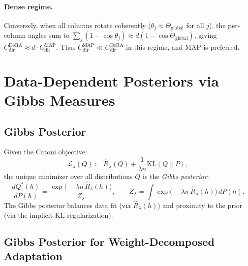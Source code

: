 \documentclass[11pt]{article}
\newcommand{\KL}{\mathrm{KL}}
\newcommand{\Rhatl}{\hat{R}_\lambda}
\begin{document}
\paragraph{Dense regime.}
Conversely, when all columns rotate coherently ($\theta_j \approx
\Theta_{\mathrm{global}}$ for all $j$), the per-column angles sum to
$\sum_j(1-\cos\theta_j) \approx d(1-\cos\Theta_{\mathrm{global}})$,
giving $C^{\mathrm{DoRA}}_{\mathrm{dir}} \approx d\cdot C^{\mathrm{MAP}}_{\mathrm{dir}}$.
Thus $C^{\mathrm{MAP}}_{\mathrm{dir}} \ll C^{\mathrm{DoRA}}_{\mathrm{dir}}$ in this regime,
and MAP is preferred.


\section{Data-Dependent Posteriors via Gibbs Measures}
\label{sec:gibbs}


\subsection{Gibbs Posterior}
\label{sec:gibbs_def}

Given the Catoni objective:
\[
  \mathcal{L}_\lambda(Q) \coloneqq \Rhatl(Q) + \frac{1}{\lambda n}\KL(Q \| P),
\]
the unique minimizer over all distributions $Q$ is the \emph{Gibbs posterior}:
\begin{equation}
  \frac{dQ^*(h)}{dP(h)}
  = \frac{\exp\bigl(-\lambda n\,\Rhatl(h)\bigr)}{Z_\lambda},
  \qquad
  Z_\lambda = \int \exp\bigl(-\lambda n\,\Rhatl(h)\bigr)\,dP(h).
\label{eq:gibbs}
\end{equation}
The Gibbs posterior balances data fit (via $\Rhatl(h)$) and proximity to
the prior (via the implicit $\KL$ regularization).

\subsection{Gibbs Posterior for Weight-Decomposed Adaptation}
\label{sec:gibbs_wda}
\end{document}
